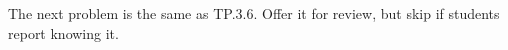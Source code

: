 \documentclass[handout]{mcs}
\begin{document}




\begin{staffnotes}
The next problem is the same as TP.3.6.  Offer it for review, but skip
if students report knowing it.
\end{staffnotes}



\end{document}
